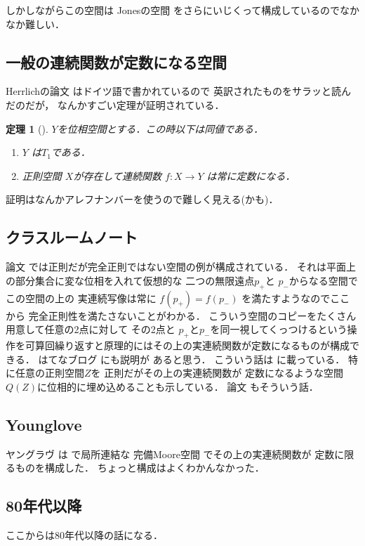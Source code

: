 \documentclass[leqno, a4paper, 12pt]{jsarticle}
\newtheorem{thm}{定理}
\begin{document}
しかしながらこの空間は
Jonesの空間
\cite{MR0093757}
をさらにいじくって構成しているのでなかなか難しい．


\subsection{一般の連続関数が定数になる空間}
Herrlichの論文
\cite{MR0185565}
はドイツ語で書かれているので
英訳されたものをサラッと読んだのだが，
なんかすごい定理が証明されている．
\begin{thm}[\cite{MR0185565}]
$Y$を位相空間とする．この時以下は同値である．
\begin{enumerate}[label=\textup{(\alph*)}]
\item 
$Y$
は$T_{1}$である．
\item 
正則空間
$X$が存在して連続関数
$f\colon X\to Y$
は常に定数になる．
\end{enumerate}
\end{thm}
証明はなんかアレフナンバーを使うので難しく見える(かも)．


\subsection{クラスルームノート}
論文\cite{MR1535290}
では正則だが完全正則ではない空間の例が構成されている．
それは平面上の部分集合に変な位相を入れて仮想的な
二つの無限遠点$p_{+}$と
$p_{-}$からなる空間でこの空間の上の
実連続写像は常に
$f(p_{+})=f(p_{-})$
を満たすようなのでここから
完全正則性を満たさないことがわかる．
こういう空間のコピーをたくさん用意して任意の2点に対して
その2点と
$p_{+}$と$p_{-}$を同一視してくっつけるという操作を可算回繰り返すと原理的にはその上の実連続関数が定数になるものが構成できる．
はてなブログ
\cite{Concon1}にも説明が
あると思う．
こういう話は
\cite{MR0271902}
に載っている．
特に任意の正則空間$Z$を
正則だがその上の実連続関数が
定数になるような空間
$Q(Z)$に位相的に埋め込めることも示している．
論文
\cite{MR0312462}
もそういう話．

\subsection{Younglove}
ヤングラヴ
は
\cite{MR0248741}
で局所連結な
完備Moore空間
でその上の実連続関数が
定数に限るものを構成した．
ちょっと構成はよくわかんなかった．


\subsection{80年代以降}
ここからは80年代以降の話になる．
\end{document}
